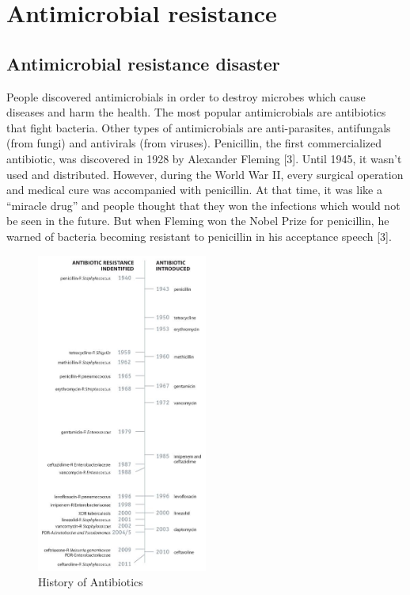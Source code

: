 \chapter{Antimicrobial resistance}

\section{Antimicrobial resistance disaster}

People discovered antimicrobials in order to destroy microbes which cause diseases and harm the health. The most popular antimicrobials are antibiotics that fight bacteria. Other types of antimicrobials are anti-parasites, antifungals (from fungi) and antivirals (from viruses). Penicillin, the first commercialized antibiotic, was discovered in 1928 by Alexander Fleming [3].  Until 1945, it wasn’t used and distributed. However, during the World War II, every surgical operation and medical cure was accompanied with penicillin. At that time, it was like a “miracle drug” and people thought that they won the infections which would not be seen in the future.  But when Fleming won the Nobel Prize for penicillin, he warned of bacteria becoming resistant to penicillin in his acceptance speech [3].

\begin{figure}[H]
  \centering
  \includegraphics[width=0.5\textwidth]{img/Fig1}
  \caption{History of Antibiotics}
  \label{fig1}
\end{figure}

